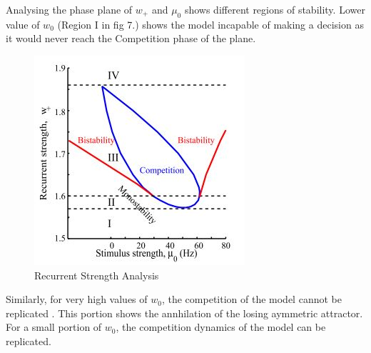 Analysing the phase plane of $w_{+}$ and $\mu_{0}$ shows different regions of stability. Lower value of $w_{0}$ (Region I in fig 7.) shows the model incapable of making a decision as it would never reach the Competition phase of the plane. 
\begin{figure}
  \includegraphics{fig/PhasePlaneReccurentStrengthAndSignal.jpg}
  \caption{Recurrent Strength Analysis}
  \label{fig:Recurrent Strength Analysis of Reduced Model}
\end{figure}
 Similarly, for very high values of $w_{0}$, the competition of the model cannot be replicated . This portion shows the annhilation of the losing aymmetric attractor. For a small portion of $w_{0}$, the competition dynamics of the model can be replicated.












